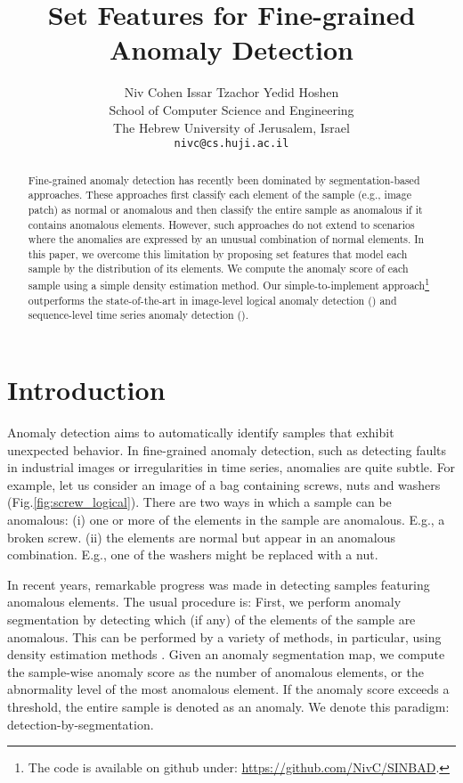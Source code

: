 \documentclass{article}
\title{Set Features for Fine-grained Anomaly Detection}
\author{\qquad Niv Cohen \qquad  Issar Tzachor \qquad Yedid Hoshen \\
School of Computer Science and Engineering \\
The Hebrew University of Jerusalem, Israel \\ 
  \texttt{nivc@cs.huji.ac.il} \\
}
\begin{document}
\maketitle


\begin{abstract}

Fine-grained anomaly detection has recently been dominated by segmentation-based approaches. These approaches first classify each element of the sample (e.g., image patch) as normal or anomalous and then classify the entire sample as anomalous if it contains anomalous elements. However, such approaches do not extend to scenarios where the anomalies are expressed by an unusual combination of normal elements. In this paper, we overcome this limitation by proposing set features that model each sample by the distribution of its elements. We compute the anomaly score of each sample using a simple density estimation method. Our simple-to-implement approach\footnote{The code is available on github under: \href{https://github.com/NivC/SINBAD}{https://github.com/NivC/SINBAD}.} outperforms the state-of-the-art in image-level logical anomaly detection () and sequence-level time series anomaly detection (). 
\end{abstract}



\section{Introduction}

Anomaly detection aims to automatically identify samples that exhibit unexpected behavior. In fine-grained anomaly detection, such as detecting faults in industrial images or irregularities in time series, anomalies are quite subtle. For example, let us consider an image of a bag containing screws, nuts and washers (Fig.\ref{fig:screw_logical}). There are two ways in which a sample can be anomalous: (i) one or more of the elements in the sample are anomalous. E.g., a broken screw. (ii) the elements are normal but appear in an anomalous combination. E.g., one of the washers might be replaced with a nut.

In recent years, remarkable progress was made in detecting samples featuring anomalous elements. The usual procedure is:
First, we perform anomaly segmentation by detecting which (if any) of the elements of the sample are anomalous. This can be performed by a variety of methods, in particular, using density estimation methods \cite{cohen2020sub,defard2021padim,roth2022towards}. Given an anomaly segmentation map, we compute the sample-wise anomaly score as the number of anomalous elements, or the abnormality level of the most anomalous element. If the anomaly score exceeds a threshold, the entire sample is denoted as an anomaly. We denote this paradigm: detection-by-segmentation.
\end{document}
